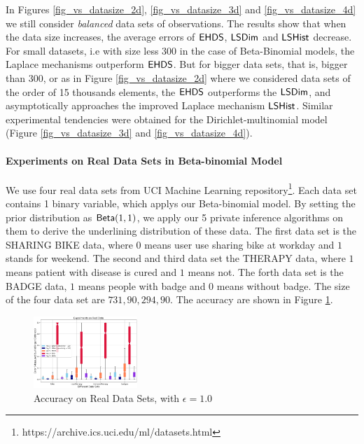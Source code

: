 \documentclass{article}
\begin{document}
In Figures \ref{fig_vs_datasize_2d}, \ref{fig_vs_datasize_3d} and \ref{fig_vs_datasize_4d} we still consider \emph{balanced} data sets
of observations. The results show that when the data size increases, the average errors of
$\mathsf{EHDS}$, $\mathsf{LSDim}$ and $\mathsf{LSHist}$ decrease. For small datasets,
i.e with size less $300$ in the case of Beta-Binomial models, the Laplace mechanisms outperform $\mathsf{EHDS}$.
But for bigger data sets, that is, bigger than $300$, or as in Figure \ref{fig_vs_datasize_2d} where
we considered data sets of the order of 15 thousands elements,
the $\mathsf{EHDS}$ outperforms the $\mathsf{LSDim}$, and asymptotically approaches the improved Laplace mechanism $\mathsf{LSHist}$.
Similar experimental tendencies were obtained for the Dirichlet-multinomial model (Figure \ref{fig_vs_datasize_3d} and \ref{fig_vs_datasize_4d}).


\paragraph{Experiments on Real Data Sets in Beta-binomial Model}
We use four real data sets from UCI Machine Learning repository\footnote{https://archive.ics.uci.edu/ml/datasets.html}. Each data set contains 1 binary variable, which applys our Beta-binomial model. By setting the prior distribution as $\mathsf{Beta}(1,1)$, we apply our 5 private inference algorithms on them to derive the underlining distribution of these data. The first data set is the SHARING BIKE data, where $0$ means user use sharing bike at workday and $1$ stands for weekend. The second and third data set the THERAPY data, where $1$ means patient with disease is cured and $1$ means not. The forth data set is the BADGE data, $1$ means people with badge and $0$ means without badge. The size of the four data set are $731, 90, 294, 90$. The accuracy are shown in Figure \ref{fig_real_2d}.
\begin{figure}
\centering
\includegraphics[width=0.35\textwidth]{realdata.eps}
\caption{Accuracy on Real Data Sets, with $\epsilon = 1.0$}
\label{fig_real_2d}
\end{figure}
\end{document}

